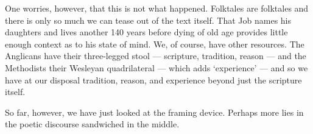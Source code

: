 One worries, however, that this is not what happened. Folktales are folktales and there is only so much we can tease out of the text itself. That Job names his daughters and lives another 140 years before dying of old age provides little enough context as to his state of mind. We, of course, have other resources. The Anglicans have their three-legged stool --- scripture, tradition, reason --- and the Methodists their Wesleyan quadrilateral --- which adds `experience' --- and so we have at our disposal tradition, reason, and experience beyond just the scripture itself.

So far, however, we have just looked at the framing device. Perhaps more lies in the poetic discourse sandwiched in the middle.

